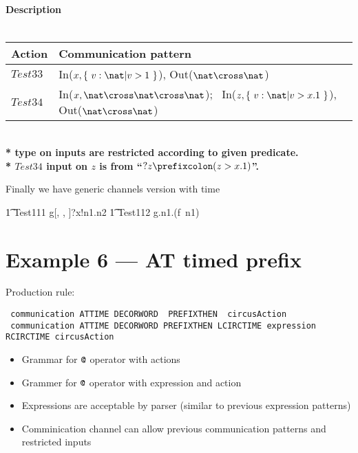 \documentclass{article}
\begin{document}
\paragraph{Description \\ \\}

\vspace{2pt}
\begin{tabular}{l|l}
   \hline
   Action   & Communication pattern \\
   \hline
   $Test33$  & In($x, \{~ v: \nat | v > 1 ~\}$), Out($\nat \cross \nat$) \\
   \hline
   $Test34$  & In($x, \nat \cross \nat \cross \nat$);~ In($z, \{~ v: \nat | v > x.1 ~\}$), Out($\nat \cross \nat$) \\
   \hline
\end{tabular}
\\

\textbf{* type on inputs are restricted according to given predicate.}
\\
\indent \textbf{* $Test34$ input on $z$ is from ``$?z \prefixcolon (z > x.1)$''.}

Finally we have generic channels version with time
%
\begin{circusaction}
   \t1 Test111 \circdef g[\nat, \nat, \nat]?x!n1.n2 \then {} \rcirctime    \Skip
   \also
   \t1 Test112 \circdef g.n1.(f~n1) \then {} \rcirctime \Skip 
\end{circusaction}


\section{Example 6 --- AT timed prefix}

Production rule:
\begin{verbatim}
 communication ATTIME DECORWORD  PREFIXTHEN  circusAction
 communication ATTIME DECORWORD PREFIXTHEN LCIRCTIME expression RCIRCTIME circusAction
\end{verbatim}

\begin{itemize}
	\item Grammar for ${\hbox{\texttt{@}}}$ operator with actions
	\item Grammer for ${\hbox{\texttt{@}}}$ operator with expression and action 
	\item Expressions are acceptable by parser (similar to previous expression patterns)
	\item Comminication channel can allow previous communication patterns and restricted inputs 
\end{itemize}
\end{document}
